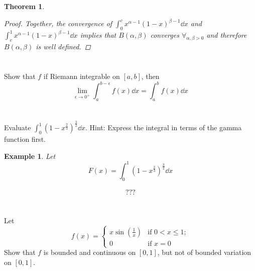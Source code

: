 \documentclass[]{article}
\newtheorem{theorem}{Theorem}
\newtheorem{example}{Example}
\begin{document}
\begin{theorem}
\begin{proof}
        Together, the convergence of $\int_{0}^{c} x^{\alpha-1} (1-x)^{\beta-1} \dd{x}$ 
        and $\int_{c}^{1} x^{\alpha-1} (1-x)^{\beta-1} \dd{x}$ 
        implies that $B(\alpha,\beta)$ converges $\forall_{\alpha,\beta>0}$ and therefore $B(\alpha,\beta)$ is well defined.
    \end{proof}
\end{theorem}



\newpage
\section{}
Show that $f$ if Riemann integrable on $[a,b]$, then \[
    \lim_{\epsilon\to 0^{+}} \int_{a}^{b - \epsilon} f(x) \dd{x} = \int_{a}^{b} f(x) \dd{x}
\]








\newpage
\section{}
Evaluate $\int_{0}^{1} (1-x^{\frac{2}{3}})^{\frac{3}{2}} \dd{x}$.
Hint: Express the integral in terms of the gamma function first.

\begin{example}
    Let \[
        F(x) = \int_{0}^{1} (1-x^{\frac{2}{3}})^{\frac{3}{2}} \dd{x}
    \]

    \begin{align*}
        ???
    \end{align*}


\end{example}




\newpage
\section{}
Let \[
    f(x) = \begin{cases}
        x \sin(\frac{1}{x}) &\text{if } 0<x \leq 1;\\
        0 &\text{if } x = 0
    \end{cases}
\] Show that $f$ is bounded and continuous on $[0,1]$, but not of bounded variation on $[0,1]$.
\end{document}

